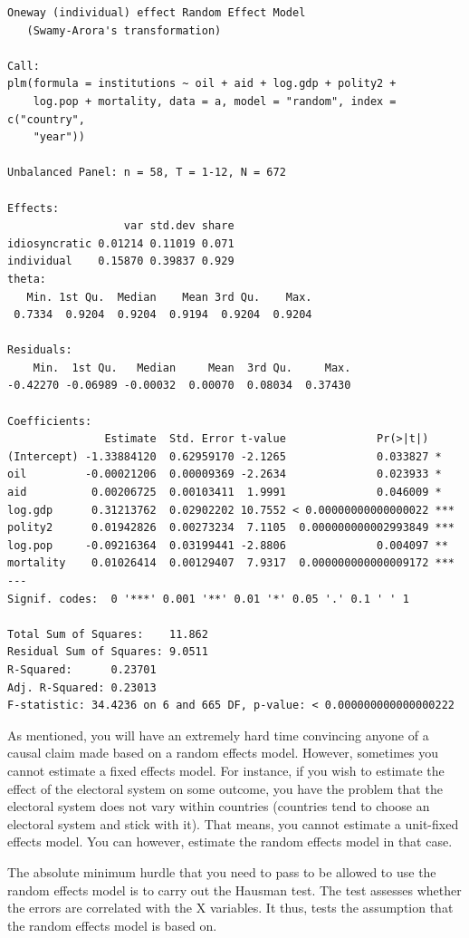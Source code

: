 \documentclass[]{article}
\theoremstyle{definition}
\theoremstyle{definition}
\theoremstyle{definition}
\theoremstyle{remark}
\begin{document}
\begin{verbatim}
Oneway (individual) effect Random Effect Model 
   (Swamy-Arora's transformation)

Call:
plm(formula = institutions ~ oil + aid + log.gdp + polity2 + 
    log.pop + mortality, data = a, model = "random", index = c("country", 
    "year"))

Unbalanced Panel: n = 58, T = 1-12, N = 672

Effects:
                  var std.dev share
idiosyncratic 0.01214 0.11019 0.071
individual    0.15870 0.39837 0.929
theta:
   Min. 1st Qu.  Median    Mean 3rd Qu.    Max. 
 0.7334  0.9204  0.9204  0.9194  0.9204  0.9204 

Residuals:
    Min.  1st Qu.   Median     Mean  3rd Qu.     Max. 
-0.42270 -0.06989 -0.00032  0.00070  0.08034  0.37430 

Coefficients:
               Estimate  Std. Error t-value              Pr(>|t|)    
(Intercept) -1.33884120  0.62959170 -2.1265              0.033827 *  
oil         -0.00021206  0.00009369 -2.2634              0.023933 *  
aid          0.00206725  0.00103411  1.9991              0.046009 *  
log.gdp      0.31213762  0.02902202 10.7552 < 0.00000000000000022 ***
polity2      0.01942826  0.00273234  7.1105  0.000000000002993849 ***
log.pop     -0.09216364  0.03199441 -2.8806              0.004097 ** 
mortality    0.01026414  0.00129407  7.9317  0.000000000000009172 ***
---
Signif. codes:  0 '***' 0.001 '**' 0.01 '*' 0.05 '.' 0.1 ' ' 1

Total Sum of Squares:    11.862
Residual Sum of Squares: 9.0511
R-Squared:      0.23701
Adj. R-Squared: 0.23013
F-statistic: 34.4236 on 6 and 665 DF, p-value: < 0.000000000000000222
\end{verbatim}

As mentioned, you will have an extremely hard time convincing anyone of
a causal claim made based on a random effects model. However, sometimes
you cannot estimate a fixed effects model. For instance, if you wish to
estimate the effect of the electoral system on some outcome, you have
the problem that the electoral system does not vary within countries
(countries tend to choose an electoral system and stick with it). That
means, you cannot estimate a unit-fixed effects model. You can however,
estimate the random effects model in that case.

The absolute minimum hurdle that you need to pass to be allowed to use
the random effects model is to carry out the Hausman test. The test
assesses whether the errors are correlated with the X variables. It
thus, tests the assumption that the random effects model is based on.
\end{document}
